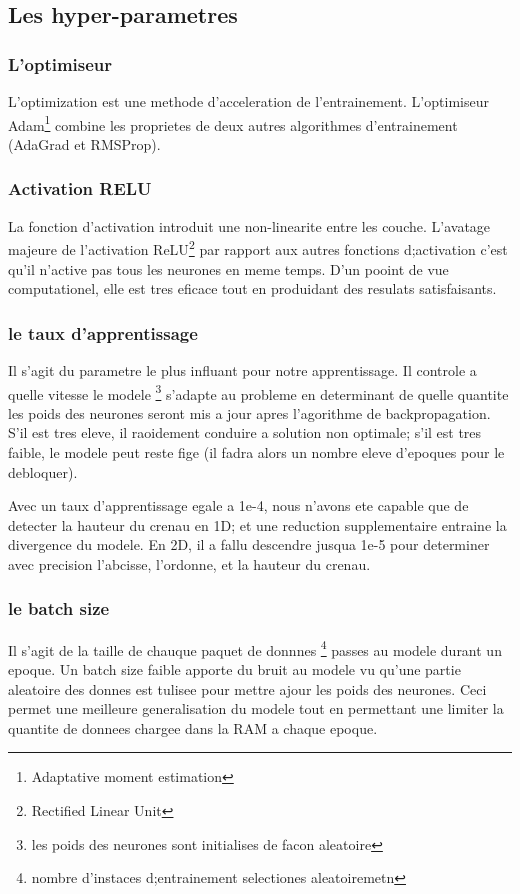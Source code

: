 \subsection{Les hyper-parametres}

\subsubsection{L'optimiseur}
L'optimization est une methode d'acceleration de l'entrainement. L'optimiseur Adam\footnote{Adaptative moment estimation} combine les proprietes de deux autres algorithmes d'entrainement (AdaGrad et RMSProp).

\subsubsection{Activation RELU}
La fonction d'activation introduit une non-linearite entre les couche. L'avatage majeure de l'activation ReLU\footnote{Rectified Linear Unit} par rapport aux autres fonctions d;activation c'est qu'il n'active pas tous les neurones en meme temps. D'un pooint de vue computationel, elle est tres eficace tout en produidant des resulats satisfaisants.

\subsubsection{le taux d'apprentissage}
Il s'agit du parametre le plus influant pour notre apprentissage. Il controle a quelle vitesse le modele \footnote{les poids des neurones sont initialises de facon aleatoire} s'adapte au probleme en determinant de quelle quantite les poids des neurones seront mis a jour apres l'agorithme de backpropagation. S'il est tres eleve, il raoidement conduire a solution non optimale; s'il est tres faible, le modele peut reste fige (il fadra alors un nombre eleve d'epoques pour le debloquer).

Avec un taux d'apprentissage egale a 1e-4, nous n'avons ete capable que de detecter la hauteur du crenau en 1D; et une reduction supplementaire entraine la divergence du modele. En 2D, il a fallu descendre jusqua 1e-5 pour determiner avec precision l'abcisse, l'ordonne, et la hauteur du crenau.

\subsubsection{le batch size}
Il s'agit de la taille de chauque paquet de donnnes \footnote{nombre d'instaces d;entrainement selectiones aleatoiremetn} passes au modele durant un epoque. Un batch size faible apporte du bruit au modele vu qu'une partie aleatoire des donnes est tulisee pour mettre ajour les poids des neurones. Ceci permet une meilleure generalisation du modele tout en permettant une limiter la quantite de donnees chargee dans la RAM a chaque epoque.

